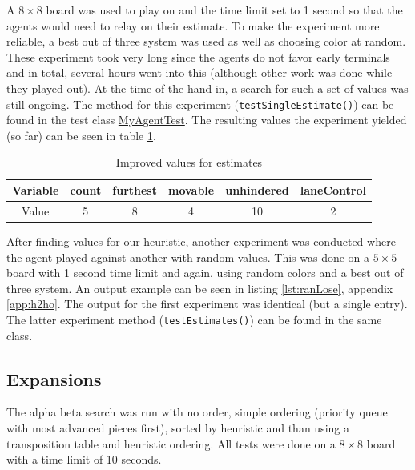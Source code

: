 \documentclass[11pt,a4paper,notitlepage]{article}
\begin{document}
A $8 \times 8$ board was used to play on and the time limit set to 1 second so that the agents would need to relay on their estimate. To make the experiment more reliable, a best out of three system was used as well as choosing color at random. These experiment took very long since the agents do not favor early terminals and in total, several hours went into this (although other work was done while they played out). At the time of the hand in, a search for such a set of values was still ongoing. The method for this experiment (\texttt{testSingleEstimate()}) can be found in the test class \href{https://github.com/JonSteinn/Breakthrough/blob/master/test/agents/MyAgentTest.java}{MyAgentTest}. The resulting values the experiment yielded (so far) can be seen in table \ref{table:valestimp}.

\begin{table}[H]
\begin{center}
\begin{tabular}{c|ccccc}
Variable & count & furthest & movable & unhindered & laneControl \\
\hline
Value & 5 & 8 & 4 & 10 & 2
\end{tabular}
\end{center}
\caption{Improved values for estimates}
\label{table:valestimp}
\end{table}

After finding values for our heuristic, another experiment was conducted where the agent played against another with random values. This was done on a $5 \times 5$ board with 1 second time limit and again, using random colors and a best out of three system. An output example can be seen in listing \ref{lst:ranLose}, appendix \ref{app:h2ho}. The output for the first experiment was identical (but a single entry). The latter experiment method (\texttt{testEstimates()}) can be found in the same class.

\subsection{Expansions}
The alpha beta search was run with no order, simple ordering (priority queue with most advanced pieces first), sorted by heuristic and than using a transposition table and heuristic ordering. All tests were done on a $8 \times 8$ board with a time limit of 10 seconds.
\end{document}
